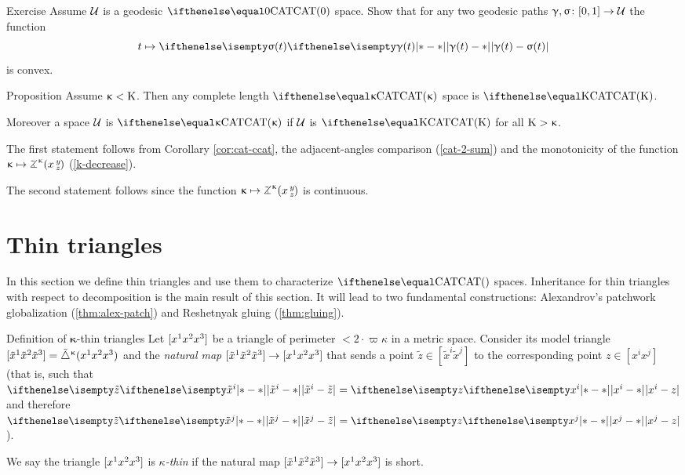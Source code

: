 \begin{thm}{Exercise}\label{ex:convexity-CAT0}
Assume $\mathcal{U}$ is a geodesic $\CAT0$ space.
Show that for any two geodesic paths 
$\gamma,\sigma\:[0,1]\to \spc{U}$
the function 
\[t\mapsto\dist{\gamma(t)}{\sigma(t)}{}\] 
is convex.
\end{thm}



\begin{thm}{Proposition}
\label{prop:inherit-bound}
Assume $\upkappa<\mathrm{K}$.
Then any complete length $\CAT\kappa$ space is $\CAT\Kappa$.

Moreover a space $\mathcal{U}$ is $\CAT\kappa$ if  $\mathcal{U}$ is $\CAT\Kappa$ for all $\mathrm{K}>\upkappa$.
\end{thm}

 The first statement follows from Corollary \ref{cor:cat-ccat}, the adjacent-angles comparison (\ref{cat-2-sum}) and the monotonicity of the function $\kappa\mapsto\angk\kappa x y z$ (\ref{k-decrease}).

The second statement follows since the function $\kappa\mapsto\angk\kappa x y z$ is continuous.
\qeds


\section{Thin triangles} \label{sec:thin-triangle}

In this section we define thin triangles
and use them to characterize $\CAT{}$ spaces.
Inheritance for thin triangles with respect to decomposition
is the main result of this section.
It will lead to two fundamental constructions:  
Alexandrov's patchwork globalization  (\ref{thm:alex-patch}) 
and Reshetnyak gluing (\ref{thm:gluing}).
 
\begin{thm}{Definition of $\bm\kappa$-thin triangles}\label{def:k-thin}
Let $[{x^1}{x^2}{x^3}]$ be a triangle of perimeter $<2\cdot \varpi\kappa$ in a metric space.
Consider its model triangle
$[{\tilde x^1}{\tilde x^2}{\tilde x^3}]={\tilde\triangle}^{\upkappa}({x^1}{x^2}{x^3})$ 
and the  \emph{natural map} $\trig{\tilde x^1}{\tilde x^2}{\tilde x^3}\to \trig{x^1}{x^2}{x^3}$ 
that sends a point $\tilde z\in[\tilde x^i\tilde x^j]$ to the corresponding point $z\in[x^ix^j]$
(that is, such that $\dist{\tilde x^i}{\tilde z}{}=\dist{x^i}{z}{}$ and therefore $\dist{\tilde x^j}{\tilde z}{}=\dist{x^j}{z}{}$).

We say the triangle $[{x^1}{x^2}{x^3}]$ is \emph{$\kappa$-thin} if the natural map $\trig{\tilde x^1}{\tilde x^2}{\tilde x^3}\to \trig{x^1}{x^2}{x^3}$ is short.
\end{thm}

